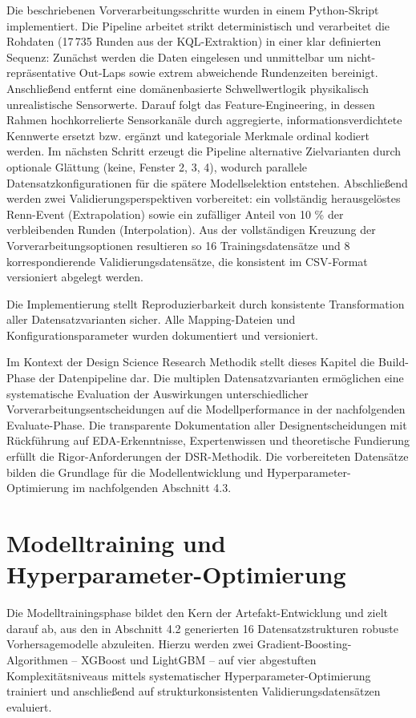 Die beschriebenen Vorverarbeitungsschritte wurden in einem Python-Skript implementiert. Die Pipeline arbeitet strikt deterministisch und verarbeitet die Rohdaten (17\,735 Runden aus der KQL-Extraktion) in einer klar definierten Sequenz: Zunächst werden die Daten eingelesen und unmittelbar um nicht-repräsentative Out-Laps sowie extrem abweichende Rundenzeiten bereinigt. Anschließend entfernt eine domänenbasierte Schwellwertlogik physikalisch unrealistische Sensorwerte. Darauf folgt das Feature-Engineering, in dessen Rahmen hochkorrelierte Sensorkanäle durch aggregierte, informationsverdichtete Kennwerte ersetzt bzw. ergänzt und kategoriale Merkmale ordinal kodiert werden. Im nächsten Schritt erzeugt die Pipeline alternative Zielvarianten durch optionale Glättung (keine, Fenster 2, 3, 4), wodurch parallele Datensatzkonfigurationen für die spätere Modellselektion entstehen. Abschließend werden zwei Validierungsperspektiven vorbereitet: ein vollständig herausgelöstes Renn-Event (Extrapolation) sowie ein zufälliger Anteil von 10 \% der verbleibenden Runden (Interpolation). Aus der vollständigen Kreuzung der Vorverarbeitungsoptionen resultieren so 16 Trainingsdatensätze und 8 korrespondierende Validierungsdatensätze, die konsistent im CSV-Format versioniert abgelegt werden.

Die Implementierung stellt Reproduzierbarkeit durch konsistente Transformation aller Datensatzvarianten sicher. Alle Mapping-Dateien und Konfigurationsparameter wurden dokumentiert und versioniert.

Im Kontext der Design Science Research Methodik stellt dieses Kapitel die Build-Phase der Datenpipeline dar. Die multiplen Datensatzvarianten ermöglichen eine systematische Evaluation der Auswirkungen unterschiedlicher Vorverarbeitungsentscheidungen auf die Modellperformance in der nachfolgenden Evaluate-Phase. Die transparente Dokumentation aller Designentscheidungen mit Rückführung auf EDA-Erkenntnisse, Expertenwissen und theoretische Fundierung erfüllt die Rigor-Anforderungen der DSR-Methodik.
Die vorbereiteten Datensätze bilden die Grundlage für die Modellentwicklung und Hyperparameter-Optimierung im nachfolgenden Abschnitt 4.3.



\section{Modelltraining und Hyperparameter-Optimierung}

Die Modelltrainingsphase bildet den Kern der Artefakt-Entwicklung und zielt darauf ab, aus den in Abschnitt 4.2 generierten 16 Datensatzstrukturen robuste Vorhersagemodelle abzuleiten. Hierzu werden zwei Gradient-Boosting-Algorithmen – XGBoost und LightGBM – auf vier abgestuften Komplexitätsniveaus mittels systematischer Hyperparameter-Optimierung trainiert und anschließend auf strukturkonsistenten Validierungsdatensätzen evaluiert.

